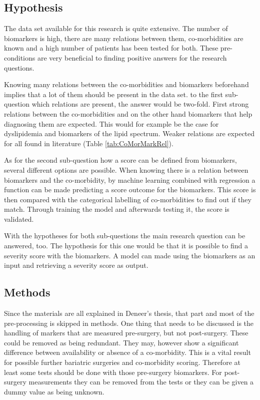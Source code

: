 \documentclass[10pt,a4paper]{report}
\begin{document}
	\subsection{Hypothesis}
	
	The data set available for this research is quite extensive. The number of biomarkers is high, there are many relations between them, co-morbidities are known and a high number of patients has been tested for both. These pre-conditions are very beneficial to finding positive answers for the research questions.
	
	Knowing many relations between the co-morbidities and biomarkers beforehand implies that a lot of them should be present in the data set. to the first sub-question which relations are present, the answer would be two-fold. First strong relations between the co-morbidities and on the other hand biomarkers that help diagnosing them are expected. This would for example be the case for dyslipidemia and biomarkers of the lipid spectrum. Weaker relations are expected for all found in literature (Table \ref{tab:CoMorMarkRel}).
	
	As for the second sub-question how a score can be defined from biomarkers, several different options are possible. When knowing there is a relation between biomarkers and the co-morbidity, by machine learning combined with regression a function can be made predicting a score outcome for the biomarkers. This score is then compared with the categorical labelling of co-morbidities to find out if they match. Through training the model and afterwards testing it, the score is validated. 
	
	With the hypotheses for both sub-questions the main research question can be answered, too. The hypothesis for this one would be that it is possible to find a severity score with the biomarkers. A model can made using the biomarkers as an input and retrieving a severity score as output.
	
	\subsection{Methods}
	
	Since the materials are all explained in Deneer's thesis, that part and most of the pre-processing is skipped in methods. One thing that needs to be discussed is the handling of markers that are measured pre-surgery, but not post-surgery. These could be removed as being redundant. They may, however show a significant difference between availability or absence of a co-morbidity. This is a vital result for possible further bariatric surgeries and co-morbidity scoring. Therefore at least some tests should be done with those pre-surgery biomarkers. For post-surgery measurements they can be removed from the tests or they can be given a dummy value as being unknown.
	
\end{document}
